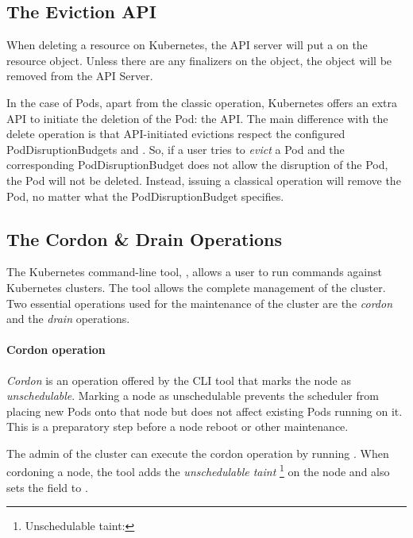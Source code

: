 \subsection{The Eviction API}
\label{section:background-eviction}

When deleting a resource on Kubernetes, the API server will put a
 on the resource object. Unless there are any finalizers
on the object, the object will be removed from the API Server.

In the case of Pods, apart from the classic  operation, Kubernetes
offers an extra API to initiate the deletion of the Pod: the  API.
The main difference with the delete operation is that API-initiated evictions
respect the configured PodDisruptionBudgets and
. So, if a user tries to \textit{evict} a Pod
and the corresponding PodDisruptionBudget does not allow the disruption of the
Pod, the Pod will not be deleted. Instead, issuing a classical 
operation will remove the Pod, no matter what the PodDisruptionBudget specifies.

\subsection{The Cordon \& Drain Operations}
\label{section:cordon-drain}

The Kubernetes command-line tool, , allows a user to run commands
against Kubernetes clusters. The tool allows the complete management of the
cluster. Two essential operations used for the maintenance of the cluster are
the \textit{cordon} and the \textit{drain} operations.

\paragraph*{Cordon operation}
\textit{Cordon} is an operation offered by the  CLI tool that marks
the node as \textit{unschedulable}. Marking a node as unschedulable prevents the
scheduler from placing new Pods onto that node but does not affect existing Pods
running on it. This is a preparatory step before a node reboot or other
maintenance.

The admin of the cluster can execute the cordon operation by running . When cordoning a node, the tool adds the \textit{unschedulable
	taint} \footnote{Unschedulable taint:
	} on the node and also sets
	the  field to .


